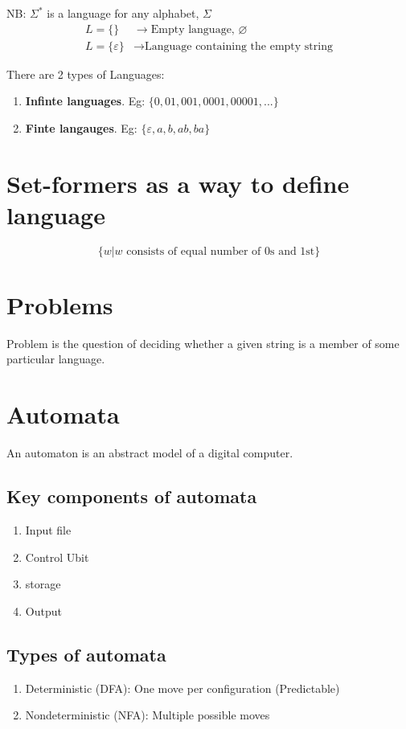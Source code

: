 \documentclass{article}
\begin{document}
NB: $\Sigma^*$ is a language for any alphabet, $\Sigma$
\begin{align*}
    L = \{\} &\rightarrow \text{Empty language, } \varnothing \\
    L = \{\varepsilon\} &\rightarrow \text{Language containing the empty string}
\end{align*}

There are 2 types of Languages:
\begin{enumerate}
    \item \textbf{Infinte languages}. Eg: $\{0, 01, 001, 0001, 00001, ...\}$
    \item \textbf{Finte langauges}. Eg: $\{\varepsilon, a, b, ab, ba\}$
\end{enumerate}

\section{Set-formers as a way to define language}
\begin{equation*}
    \{w | w \text{ consists of equal number of 0s and 1st}\}
\end{equation*}

\section{Problems}
Problem is the question of deciding whether a given string is a member of some particular language.

\section{Automata}
An automaton is an abstract model of a digital computer.

\subsection{Key components of automata}
\begin{enumerate}
    \item Input file
    \item Control Ubit
    \item storage
    \item Output
\end{enumerate}

\subsection{Types of automata}
\begin{enumerate}
    \item Deterministic (DFA): One move per configuration (Predictable)
    \item Nondeterministic (NFA): Multiple possible moves
\end{enumerate}
\end{document}
